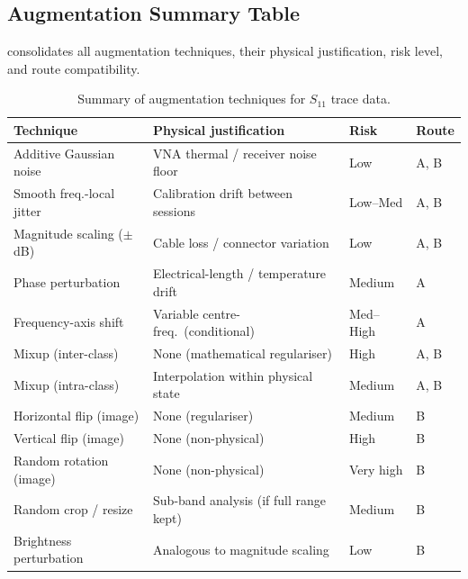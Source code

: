 \subsection{Augmentation Summary Table}
\label{sec:augment:table}

 consolidates all augmentation techniques,
their physical justification, risk level, and route compatibility.

\begin{table}[ht]
\centering
\caption{Summary of augmentation techniques for $S_{11}$ trace data.}
\label{tab:augment_summary}
\small
\renewcommand{\arraystretch}{1.15}
\begin{tabular}{p{3.2cm} p{3.6cm} p{1.4cm} p{1.7cm}}
\toprule
\textbf{Technique} &
\textbf{Physical justification} &
\textbf{Risk} &
\textbf{Route} \\
\midrule
Additive Gaussian noise &
  VNA thermal / receiver noise floor &
  Low &
  A, B \\
Smooth freq.-local jitter &
  Calibration drift between sessions &
  Low--Med &
  A, B \\
Magnitude scaling ($\pm$\,dB) &
  Cable loss / connector variation &
  Low &
  A, B \\
Phase perturbation &
  Electrical-length / temperature drift &
  Medium &
  A \\
Frequency-axis shift &
  Variable centre-freq.\ (conditional) &
  Med--High &
  A \\
Mixup (inter-class) &
  None (mathematical regulariser) &
  High &
  A, B \\
Mixup (intra-class) &
  Interpolation within physical state &
  Medium &
  A, B \\
Horizontal flip (image) &
  None (regulariser) &
  Medium &
  B \\
Vertical flip (image) &
  None (non-physical) &
  High &
  B \\
Random rotation (image) &
  None (non-physical) &
  Very high &
  B \\
Random crop / resize &
  Sub-band analysis (if full range kept) &
  Medium &
  B \\
Brightness perturbation &
  Analogous to magnitude scaling &
  Low &
  B \\
\bottomrule
\end{tabular}
\end{table}

